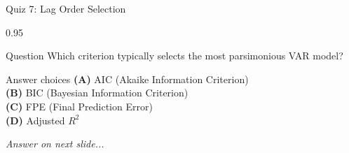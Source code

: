 \documentclass[9pt, aspectratio=169, t]{beamer}
\begin{document}
\begin{frame}{Quiz 7: Lag Order Selection}
    \begin{cminipage}{0.95\textwidth}
    \begin{alertblock}{Question}
        Which criterion typically selects the most parsimonious VAR model?
    \end{alertblock}

    \vspace{0.4cm}

    \begin{block}{Answer choices}
        \textcolor{MainBlue}{\textbf{(A)}} AIC (Akaike Information Criterion)\\[3pt]
        \textcolor{MainBlue}{\textbf{(B)}} BIC (Bayesian Information Criterion)\\[3pt]
        \textcolor{MainBlue}{\textbf{(C)}} FPE (Final Prediction Error)\\[3pt]
        \textcolor{MainBlue}{\textbf{(D)}} Adjusted $R^2$
    \end{block}

    \vspace{0.5cm}

    \begin{center}
        \textit{Answer on next slide...}
    \end{center}
    \end{cminipage}
\end{frame}
\end{document}
